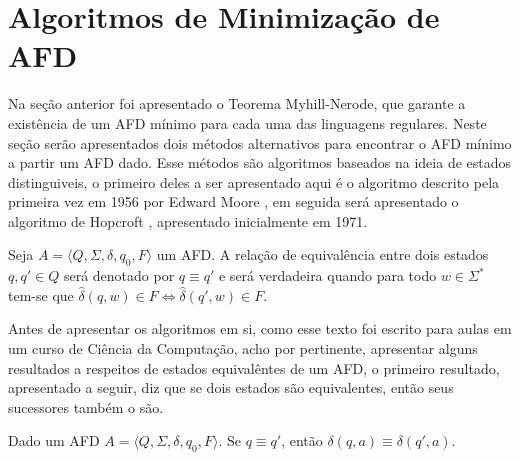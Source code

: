 \section{Algoritmos de Minimização de AFD}

Na seção anterior foi apresentado o Teorema Myhill-Nerode, que garante a existência de um AFD mínimo para cada uma das linguagens regulares. Neste seção serão apresentados dois métodos alternativos para encontrar o AFD mínimo a partir um AFD dado. Esse métodos são algoritmos baseados na ideia de estados distinguiveis, o primeiro deles a ser apresentado aqui é o algoritmo descrito pela primeira vez em 1956 por Edward Moore \cite{erickson2014, moore1956}, em seguida será apresentado o algoritmo de Hopcroft \cite{hopcroft1971}, apresentado inicialmente em 1971.

\begin{definicao}\label{def:EquivalenciaEstados}
	Seja $A = \langle Q, \Sigma, \delta, q_0, F\rangle$ um AFD. A relação de equivalência entre dois estados $q, q' \in Q$ será denotado por $q \equiv q'$ e será verdadeira quando para todo $w \in \Sigma^*$ tem-se que $\widehat{\delta}(q, w) \in F \Longleftrightarrow \widehat{\delta}(q', w) \in F$.
\end{definicao}

Antes de apresentar os algoritmos em si, como esse texto foi escrito para aulas em um curso de Ciência da Computação, acho por pertinente, apresentar alguns resultados a respeitos de estados equivalêntes de um AFD, o primeiro resultado, apresentado a seguir, diz que se dois estados são equivalentes, então seus sucessores também o são.

\begin{lema}\label{lema:SucessoresEquivalentes}
	Dado um AFD $A = \langle Q, \Sigma, \delta, q_0, F\rangle$. Se $q \equiv q'$, então $\delta(q, a) \equiv \delta(q', a)$.
\end{lema}


